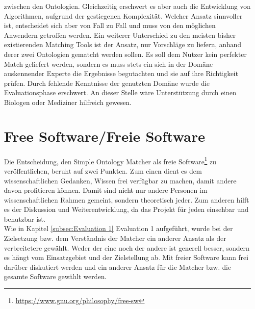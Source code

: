 zwischen den Ontologien. Gleichzeitig erschwert es aber auch die Entwicklung von
Algorithmen, aufgrund der gestiegenen Komplexität. Welcher Ansatz sinnvoller
ist, entscheidet sich aber von Fall zu Fall und muss von den möglichen Anwendern
getroffen werden. Ein weiterer Unterschied zu den meisten bisher existierenden
Matching Tools ist der Ansatz, nur Vorschläge zu liefern, anhand derer zwei
Ontologien gematcht werden sollen. Es soll dem Nutzer kein perfekter Match
geliefert werden, sondern es muss stets ein sich in der Domäne auskennender
Experte die Ergebnisse begutachten und sie auf ihre Richtigkeit prüfen. Durch
fehlende Kenntnisse der genutzten Domäne wurde die Evaluationsphase erschwert.
An dieser Stelle wäre Unterstützung durch einen Biologen oder Mediziner
hilfreich gewesen.

\section{Free Software/Freie Software}
Die Entscheidung, den Simple Ontology Matcher als freie
Software\footnote{\url{https://www.gnu.org/philosophy/free-sw}} zu veröffentlichen, beruht auf zwei Punkten. Zum einen dient es dem
wissenschaftlichen Gedanken, Wissen frei verfügbar zu machen, damit andere davon
profitieren können. Damit sind nicht nur andere Personen im wissenschaftlichen
Rahmen gemeint, sondern theoretisch jeder. Zum anderen hilft es der Diskussion
und Weiterentwicklung, da das Projekt für jeden einsehbar und benutzbar ist.\\
Wie in Kapitel \ref{subsec:Evaluation 1} Evaluation 1 aufgeführt, wurde bei der
Zielsetzung bzw. dem Verständnis der Matcher ein anderer Ansatz als der
verbreitetere gewählt. Weder der eine noch der andere ist generell besser,
sondern es hängt vom Einsatzgebiet und der Zielstellung ab. Mit freier Software
kann frei darüber diskutiert werden und ein anderer Ansatz für die Matcher bzw.
die gesamte Software gewählt werden.

\cleardoublepage
\pagebreak[4]